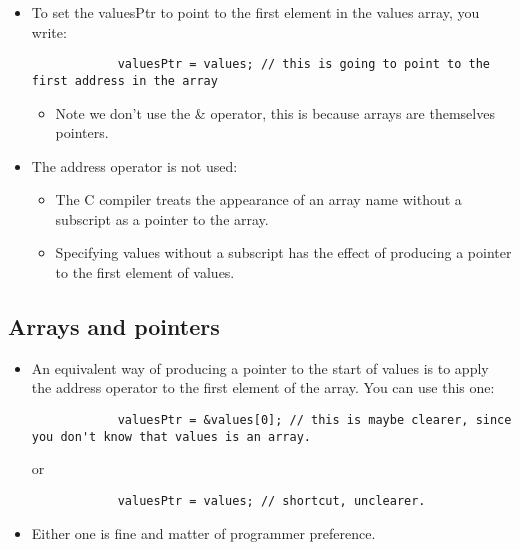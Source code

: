 \begin{itemize}
    \item To set the valuesPtr to point to the first element in the values array, you write: 
        \begin{verbatim}
            valuesPtr = values; // this is going to point to the first address in the array
        \end{verbatim}
        \begin{itemize}
            \item Note we don't use the \& operator, this is because arrays are themselves pointers. 
        \end{itemize}
    
    \item The address operator is not used: 
        \begin{itemize}
            \item The C compiler treats the appearance of an array name without a subscript as a pointer to the array. 
            \item Specifying values without a subscript has the effect of producing a pointer to the first element of values.
        \end{itemize}
\end{itemize}

\subsection{Arrays and pointers}
\begin{itemize}
    \item An equivalent way of producing a pointer to the start of values is to apply the address operator to the first element of the array. You can use this one:  
        \begin{verbatim}
            valuesPtr = &values[0]; // this is maybe clearer, since you don't know that values is an array. 
        \end{verbatim}
        or 
        \begin{verbatim}
            valuesPtr = values; // shortcut, unclearer.
        \end{verbatim}
    
    \item Either one is fine and matter of programmer preference. 
\end{itemize}

